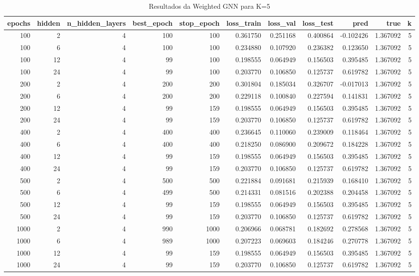 \begin{table}
\caption{Resultados da Weighted GNN para K=5}
\label{tab:weighted_gnn_results_k5}
\begin{tabular}{rrrrrrrrrrr}
\toprule
epochs & hidden & n\_hidden\_layers & best\_epoch & stop\_epoch & loss\_train & loss\_val & loss\_test & pred & true & k \\
\midrule
100 & 2 & 4 & 100 & 100 & 0.361750 & 0.251168 & 0.400864 & -0.102426 & 1.367092 & 5 \\
100 & 6 & 4 & 100 & 100 & 0.234880 & 0.107920 & 0.236382 & 0.123650 & 1.367092 & 5 \\
100 & 12 & 4 & 99 & 100 & 0.198555 & 0.064949 & 0.156503 & 0.395485 & 1.367092 & 5 \\
100 & 24 & 4 & 99 & 100 & 0.203770 & 0.106850 & 0.125737 & 0.619782 & 1.367092 & 5 \\
200 & 2 & 4 & 200 & 200 & 0.301804 & 0.185034 & 0.326707 & -0.017013 & 1.367092 & 5 \\
200 & 6 & 4 & 200 & 200 & 0.229118 & 0.100840 & 0.227594 & 0.141831 & 1.367092 & 5 \\
200 & 12 & 4 & 99 & 159 & 0.198555 & 0.064949 & 0.156503 & 0.395485 & 1.367092 & 5 \\
200 & 24 & 4 & 99 & 159 & 0.203770 & 0.106850 & 0.125737 & 0.619782 & 1.367092 & 5 \\
400 & 2 & 4 & 400 & 400 & 0.236645 & 0.110060 & 0.239009 & 0.118464 & 1.367092 & 5 \\
400 & 6 & 4 & 400 & 400 & 0.218250 & 0.086900 & 0.209672 & 0.184228 & 1.367092 & 5 \\
400 & 12 & 4 & 99 & 159 & 0.198555 & 0.064949 & 0.156503 & 0.395485 & 1.367092 & 5 \\
400 & 24 & 4 & 99 & 159 & 0.203770 & 0.106850 & 0.125737 & 0.619782 & 1.367092 & 5 \\
500 & 2 & 4 & 500 & 500 & 0.221884 & 0.091681 & 0.215939 & 0.168410 & 1.367092 & 5 \\
500 & 6 & 4 & 499 & 500 & 0.214331 & 0.081516 & 0.202388 & 0.204458 & 1.367092 & 5 \\
500 & 12 & 4 & 99 & 159 & 0.198555 & 0.064949 & 0.156503 & 0.395485 & 1.367092 & 5 \\
500 & 24 & 4 & 99 & 159 & 0.203770 & 0.106850 & 0.125737 & 0.619782 & 1.367092 & 5 \\
1000 & 2 & 4 & 990 & 1000 & 0.206966 & 0.068781 & 0.182692 & 0.278568 & 1.367092 & 5 \\
1000 & 6 & 4 & 989 & 1000 & 0.207223 & 0.069603 & 0.184246 & 0.270778 & 1.367092 & 5 \\
1000 & 12 & 4 & 99 & 159 & 0.198555 & 0.064949 & 0.156503 & 0.395485 & 1.367092 & 5 \\
1000 & 24 & 4 & 99 & 159 & 0.203770 & 0.106850 & 0.125737 & 0.619782 & 1.367092 & 5 \\
\bottomrule
\end{tabular}
\end{table}
